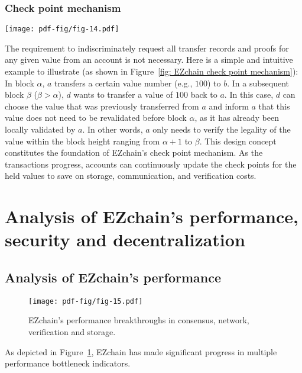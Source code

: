 \documentclass[conference]{IEEEtran}
\begin{document}
\subsubsection{Check point mechanism}
\label{subsubsec: Check point mechanism}
\begin{figure*}[h!]
    \centering
    \texttt{[image: pdf-fig/fig-14.pdf]}
    \caption{EZchain's check point mechanism.}
    \label{fig: EZchain check point mechanism}
\end{figure*}
The requirement to indiscriminately request all transfer records and proofs for any given value from an account is not necessary. Here is a simple and intuitive example to illustrate (as shown in Figure~\ref{fig: EZchain check point mechanism}): In block $\alpha$, $a$ transfers a certain value number (e.g., $100$) to $b$. In a subsequent block $\beta$ ($\beta > \alpha$), $d$ wants to transfer a value of $100$ back to $a$. In this case, $d$ can choose the value that was previously transferred from $a$ and inform $a$ that this value does not need to be revalidated before block $\alpha$, as it has already been locally validated by $a$. In other words, $a$ only needs to verify the legality of the value within the block height ranging from $\alpha + 1$ to $\beta$. This design concept constitutes the foundation of EZchain's check point mechanism. As the transactions progress, accounts can continuously update the check points for the held values to save on storage, communication, and verification costs.

\section{Analysis of EZchain's performance, security and decentralization}
\label{sec: EZchain's analysis}

\subsection{Analysis of EZchain's performance}
\label{subsec: EZchain's performance analysis}
\begin{figure}[htp!]
    \centering
    \texttt{[image: pdf-fig/fig-15.pdf]}
    \caption{EZchain's performance breakthroughs in consensus, network, verification and storage.}
    \label{fig: EZchain's performance breakthrough}
\end{figure}
As depicted in Figure~\ref{fig: EZchain's performance breakthrough}, EZchain has made significant progress in multiple performance bottleneck indicators.
\end{document}
